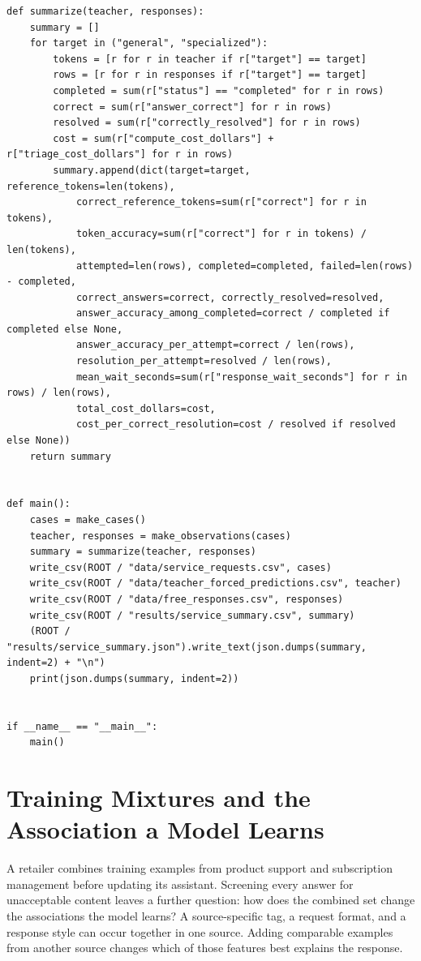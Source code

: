 \begin{Verbatim}[breaklines,breakanywhere,fontsize=\small]
def summarize(teacher, responses):
    summary = []
    for target in ("general", "specialized"):
        tokens = [r for r in teacher if r["target"] == target]
        rows = [r for r in responses if r["target"] == target]
        completed = sum(r["status"] == "completed" for r in rows)
        correct = sum(r["answer_correct"] for r in rows)
        resolved = sum(r["correctly_resolved"] for r in rows)
        cost = sum(r["compute_cost_dollars"] + r["triage_cost_dollars"] for r in rows)
        summary.append(dict(target=target, reference_tokens=len(tokens),
            correct_reference_tokens=sum(r["correct"] for r in tokens),
            token_accuracy=sum(r["correct"] for r in tokens) / len(tokens),
            attempted=len(rows), completed=completed, failed=len(rows) - completed,
            correct_answers=correct, correctly_resolved=resolved,
            answer_accuracy_among_completed=correct / completed if completed else None,
            answer_accuracy_per_attempt=correct / len(rows),
            resolution_per_attempt=resolved / len(rows),
            mean_wait_seconds=sum(r["response_wait_seconds"] for r in rows) / len(rows),
            total_cost_dollars=cost,
            cost_per_correct_resolution=cost / resolved if resolved else None))
    return summary


def main():
    cases = make_cases()
    teacher, responses = make_observations(cases)
    summary = summarize(teacher, responses)
    write_csv(ROOT / "data/service_requests.csv", cases)
    write_csv(ROOT / "data/teacher_forced_predictions.csv", teacher)
    write_csv(ROOT / "data/free_responses.csv", responses)
    write_csv(ROOT / "results/service_summary.csv", summary)
    (ROOT / "results/service_summary.json").write_text(json.dumps(summary, indent=2) + "\n")
    print(json.dumps(summary, indent=2))


if __name__ == "__main__":
    main()
\end{Verbatim}

\hypertarget{M07-training-mixtures-and-the-association-a-model-learns}{%
\section{Training Mixtures and the Association a Model
Learns}\label{M07-training-mixtures-and-the-association-a-model-learns}}

\noindent \noindent A retailer combines training examples from product support and
subscription management before updating its assistant. Screening every
answer for unacceptable content leaves a further question: how does the
combined set change the associations the model learns? A source-specific
tag, a request format, and a response style can occur together in one
source. Adding comparable examples from another source changes which of
those features best explains the response.


